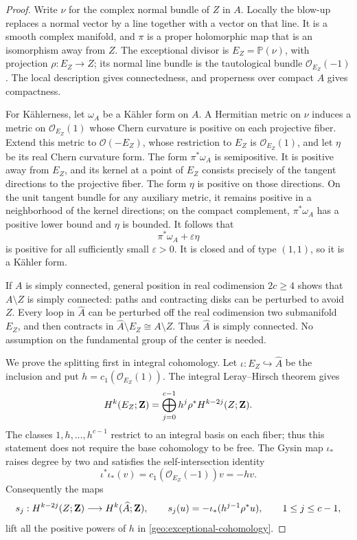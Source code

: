 \begin{proof}
Write $\nu$ for the complex normal bundle of $Z$ in $A$. Locally the
blow-up replaces a normal vector by a line together with a vector on
that line. It is a smooth complex manifold, and $\pi$ is a proper
holomorphic map that is an isomorphism away from $Z$. The exceptional
divisor is $E_Z=\mathbb P(\nu)$, with projection $\rho:E_Z\to Z$;
its normal line bundle is the tautological bundle $\mathcal O_{E_Z}(-1)$.
The local description gives connectedness, and properness over compact
$A$ gives compactness.

For K\"ahlerness, let $\omega_A$ be a K\"ahler form on $A$. A Hermitian
metric on $\nu$ induces a metric on $\mathcal O_{E_Z}(1)$ whose Chern
curvature is positive on each projective fiber. Extend this metric to
$\mathcal O(-E_Z)$, whose restriction to $E_Z$ is
$\mathcal O_{E_Z}(1)$, and let $\eta$ be its real Chern curvature form.
The form $\pi^*\omega_A$ is semipositive. It is positive away from
$E_Z$, and its kernel at a point of $E_Z$ consists precisely of the
tangent directions to the projective fiber. The form $\eta$ is positive
on those directions. On the unit tangent bundle for any auxiliary
metric, it remains positive in a neighborhood of the kernel directions;
on the compact complement, $\pi^*\omega_A$ has a positive lower bound
and $\eta$ is bounded. It follows that
\[
 \pi^*\omega_A+\varepsilon\eta
\]
is positive for all sufficiently small $\varepsilon>0$. It is closed
and of type $(1,1)$, so it is a K\"ahler form.

If $A$ is simply connected, general position in real codimension
$2c\geq4$ shows that $A\setminus Z$ is simply connected: paths and
contracting disks can be perturbed to avoid $Z$. Every loop in
$\widehat A$ can be perturbed off the real codimension two submanifold
$E_Z$, and then contracts in
$\widehat A\setminus E_Z\cong A\setminus Z$. Thus $\widehat A$ is
simply connected. No assumption on the fundamental group of the center
is needed.

We prove the splitting first in integral cohomology. Let
$\iota:E_Z\hookrightarrow\widehat A$ be the inclusion and put
$h=c_1(\mathcal O_{E_Z}(1))$. The integral Leray--Hirsch theorem gives
\begin{equation}
\label{geo:exceptional-cohomology}
 H^k(E_Z;\mathbf Z)=
 \bigoplus_{j=0}^{c-1}h^j\rho^*H^{k-2j}(Z;\mathbf Z).
\end{equation}
The classes $1,h,\ldots,h^{c-1}$ restrict to an integral basis on each
fiber; thus this statement does not require the base cohomology to be
free. The Gysin map $\iota_*$ raises degree by two and satisfies the
self-intersection identity
\[
 \iota^*\iota_*(v)=c_1(\mathcal O_{E_Z}(-1))v=-hv.
\]
Consequently the maps
\[
 s_j:H^{k-2j}(Z;\mathbf Z)\longrightarrow H^k(\widehat A;\mathbf Z),
 \qquad s_j(u)=-\iota_*(h^{j-1}\rho^*u),
 \qquad 1\leq j\leq c-1,
\]
lift all the positive powers of $h$ in
\eqref{geo:exceptional-cohomology}.


\end{proof}
